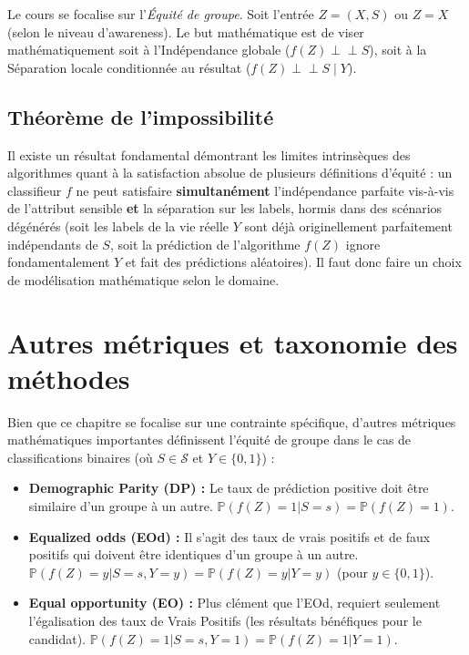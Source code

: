 Le cours se focalise sur l'\textit{Équité de groupe}. Soit l'entrée $Z = (X,S)$ ou $Z=X$ (selon le niveau d'awareness). Le but mathématique est de viser mathématiquement soit à l'Indépendance globale ($f(Z) \perp \!\!\! \perp S$), soit à la Séparation locale conditionnée au résultat ($f(Z) \perp \!\!\! \perp S \mid Y$).

\subsection{Théorème de l'impossibilité}
Il existe un résultat fondamental démontrant les limites intrinsèques des algorithmes quant à la satisfaction absolue de plusieurs définitions d'équité : un classifieur $f$ ne peut satisfaire \textbf{simultanément} l'indépendance parfaite vis-à-vis de l'attribut sensible \textbf{et} la séparation sur les labels, hormis dans des scénarios dégénérés (soit les labels de la vie réelle $Y$ sont déjà originellement parfaitement indépendants de $S$, soit la prédiction de l'algorithme $f(Z)$ ignore fondamentalement $Y$ et fait des prédictions aléatoires). Il faut donc faire un choix de modélisation mathématique selon le domaine.

\section{Autres métriques et taxonomie des méthodes}

Bien que ce chapitre se focalise sur une contrainte spécifique, d'autres métriques mathématiques importantes définissent l'équité de groupe dans le cas de classifications binaires (où $S \in \mathcal{S}$ et $Y \in \{0, 1\}$) :
\begin{itemize}
    \item \textbf{Demographic Parity (DP) :} Le taux de prédiction positive doit être similaire d'un groupe à un autre. $\mathbb{P}(f(Z)=1|S=s) = \mathbb{P}(f(Z)=1)$.
    \item \textbf{Equalized odds (EOd) :} Il s'agit des taux de vrais positifs et de faux positifs qui doivent être identiques d'un groupe à un autre. $\mathbb{P}(f(Z)=y|S=s, Y=y) = \mathbb{P}(f(Z)=y|Y=y)$ (pour $y \in \{0, 1\}$).
    \item \textbf{Equal opportunity (EO) :} Plus clément que l'EOd, requiert seulement l'égalisation des taux de Vrais Positifs (les résultats bénéfiques pour le candidat). $\mathbb{P}(f(Z)=1|S=s, Y=1) = \mathbb{P}(f(Z)=1|Y=1)$.
\end{itemize}

